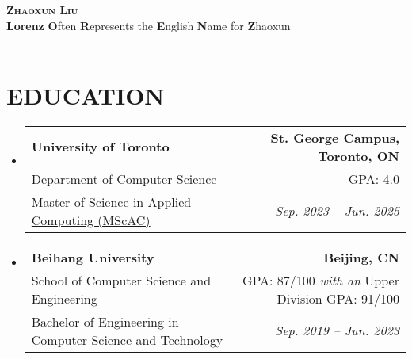 \documentclass[letterpaper,11pt]{article}
\makeatletter
\newcommand{\education}[6]{
  \vspace{-2pt}\item
    \begin{tabular*}{1.0\textwidth}[t]{l@{\extracolsep{\fill}}r}
      \textbf{#1} & \textbf{\small{#2}} \\
      {#5} & {#6} \\
      {#3} & \textit{ #4} \\
    \end{tabular*}\vspace{-7pt}
}
\newcommand{\resumeSubHeadingListStart}{\begin{itemize}[leftmargin=0.0in, label={}]}
\newcommand{\resumeSubHeadingListEnd}{\end{itemize}}
\makeatother
\begin{document}

\begin{center}
    {\Huge \scshape \textbf{Zhaoxun Liu}} \\ \vspace{5pt}
    {\Large \textbf{Lorenz}} {\textbf{O}ften \textbf{R}epresents the \textbf{E}nglish \textbf{N}ame for \textbf{Z}haoxun} \\ \vspace{5pt}
    \small \href{https://www.linkedin.com/in/zhaoxun-lorenz-liu/}{\raisebox{-0.1\height}\faLinkedin} ~ \href{mailto:lorenz@cs.toronto.edu}{\raisebox{-0.2\height}\faEnvelope} ~
    \href{https://lorenz.fun/}{\raisebox{-0.2\height}\faHome}  ~
    \href{https://github.com/lorenz-liu}{\raisebox{-0.2\height}\faGithub}
    \vspace{-8pt}
\end{center}


\section{EDUCATION}
  \resumeSubHeadingListStart
    \education
      {University of Toronto}{St. George Campus, Toronto, ON}
      {\href{https://mscac.utoronto.ca/}{Master of Science in Applied Computing (MScAC)}}{Sep. 2023 -- Jun. 2025}
      {Department of Computer Science}{GPA: 4.0}
    \education
      {Beihang University}{Beijing, CN}
      {Bachelor of Engineering in Computer Science and Technology}{Sep. 2019 -- Jun. 2023}
      {School of Computer Science and Engineering}{GPA: 87/100 \textit{with an} Upper Division GPA: 91/100}
  \resumeSubHeadingListEnd
\end{document}
